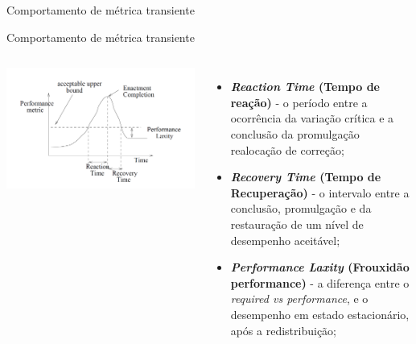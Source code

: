 \begin{frame}{Comportamento de métrica transiente}

\end{frame}

\begin{frame}{Comportamento de métrica transiente}
	\begin{columns}
		\begin{minipage}[c][0.45\textheight][c]{\linewidth}
			\centering
			\includegraphics[width=1.27\linewidth]{../monograph/images/transient-metric.png}
			\label{fig:transient-metric}	
		\end{minipage}
		\begin{minipage}[c][0.55\textheight][c]{\linewidth}
			\begin{itemize}
				\item \textbf{\textit{Reaction Time} (Tempo de reação)} - o período entre a ocorrência da variação crítica e a conclusão da promulgação realocação de correção;
				
				\item \textbf{\textit{Recovery Time} (Tempo de Recuperação)} - o intervalo entre a conclusão, promulgação e da restauração de um nível de desempenho aceitável;
				
				\item \textbf{\textit{Performance Laxity} (Frouxidão performance)} - a diferença entre o \textit{required vs performance}, e o desempenho em estado estacionário, após a redistribuição;
			\end{itemize}
		\end{minipage}		
	\end{columns}
\end{frame}

